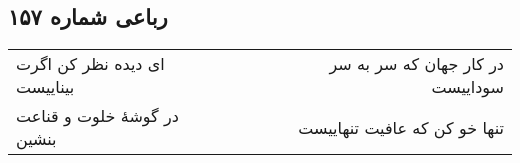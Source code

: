 \begin{center}
\section*{رباعی شماره ۱۵۷}
\label{sec:sh157}
\begin{longtable}{l p{0.5cm} r}
ای دیده نظر کن اگرت بیناییست
&&
در کار جهان که سر به سر سوداییست
\\
در گوشهٔ خلوت و قناعت بنشین
&&
تنها خو کن که عافیت تنهاییست
\\
\end{longtable}
\end{center}

